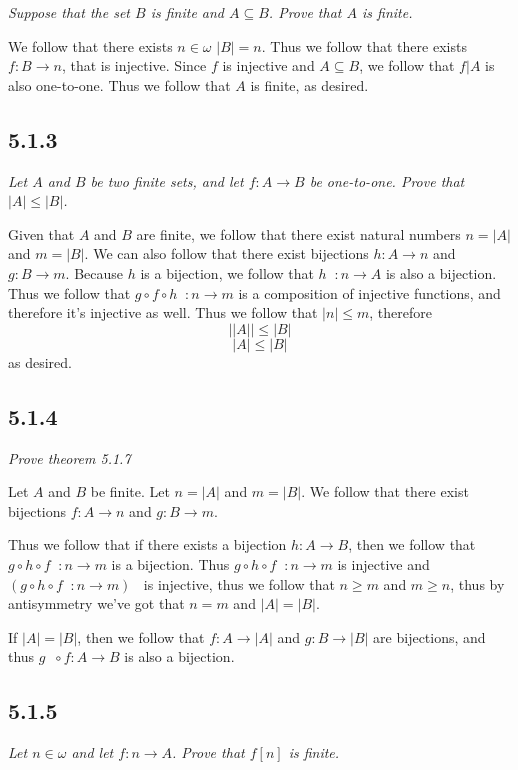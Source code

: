 \documentclass[11pt,oneside,titlepage]{book}
\DeclareMathOperator \inv {^{-1}}
\begin{document}
\textit{Suppose that the set $B$ is finite and $A \subseteq B$. Prove that $A$ is finite.}

We follow that there exists $n \in \omega$ $|B| = n$. Thus we follow that
there exists $f: B \to n$, that is injective. Since $f$ is injective and $A \subseteq B$,
we follow that $f|A$ is also one-to-one. Thus we follow that $A$ is finite, as desired.

\subsection*{5.1.3}

\textit{Let $A$ and $B$ be two finite sets, and let $f: A \to B$ be one-to-one. Prove
  that $|A| \leq |B|$. }

Given that $A$ and $B$ are finite, we follow that there exist natural numbers $n = |A|$ and
$m = |B|$. We can also follow that there exist bijections $h: A \to n$ and $g: B \to m$.
Because $h$ is a bijection, we follow that $h \inv: n \to A$ is also a bijection.
Thus we follow that $g \circ f \circ h \inv: n \to m $ is a composition of injective functions,
and therefore it's injective as well. Thus we follow that $|n| \leq m$, therefore
$$||A|| \leq |B|$$
$$|A| \leq |B|$$
as desired.

\subsection*{5.1.4}

\textit{Prove theorem 5.1.7 }

Let $A$ and $B$ be finite. Let $n = |A|$ and $m = |B|$. We follow that there exist bijections
$f: A \to n$ and $g: B \to m$.

Thus we follow that if there exists a bijection $h: A \to B$,
then we follow that $g \circ h \circ f \inv: n \to m$ is a bijection. Thus
$g \circ h \circ f \inv: n \to m$ is injective and
$(g \circ h \circ f \inv: n \to m)\inv$ is injective, thus we follow that $n \geq m$ and
$m \geq n$, thus by antisymmetry we've got that $n = m$ and $|A| = |B|$.

If $|A| = |B|$, then we follow that $f: A \to |A|$ and $g: B \to |B|$ are bijections,
and thus $g \inv \circ f: A \to B$ is also a bijection.

\subsection*{5.1.5}

\textit{Let $n \in \omega$ and let $f: n \to A$. Prove that $f[n]$ is finite.}
\end{document}
